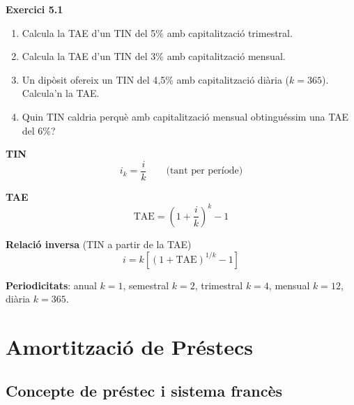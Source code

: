 \documentclass[12pt]{article}
\begin{document}
\begin{exercici}
\textbf{Exercici 5.1}\\
\begin{enumerate}[label=\alph*)]
    \item Calcula la TAE d'un TIN del 5\% amb capitalització trimestral.
    \item Calcula la TAE d'un TIN del 3\% amb capitalització mensual.
    \item Un dipòsit ofereix un TIN del 4{,}5\% amb capitalització diària ($k=365$). Calcula'n la TAE.
    \item Quin TIN caldria perquè amb capitalització mensual obtinguéssim una TAE del 6\%?
\end{enumerate}
\end{exercici}

\begin{resum}[title=Resum 5: TAE i TIN]
\textbf{TIN}
\[
i_k = \dfrac{i}{k} \qquad \text{(tant per període)}
\]

\textbf{TAE}
\[
\text{TAE} = \left(1 + \dfrac{i}{k}\right)^k - 1
\]

\textbf{Relació inversa} (TIN a partir de la TAE)
\[
i = k \left[(1+\text{TAE})^{1/k} - 1\right]
\]

\textbf{Periodicitats}: anual $k=1$, semestral $k=2$, trimestral $k=4$, mensual $k=12$, diària $k=365$.
\end{resum}

\newpage

\section{Amortització de Préstecs}

\subsection{Concepte de préstec i sistema francès}
\end{document}
